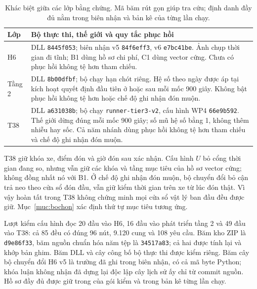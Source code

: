 \begin{table}[htbp]
\centering
\caption{Khác biệt giữa các lớp bằng chứng. Mã băm rút gọn giúp tra cứu;
định danh đầy đủ nằm trong biên nhận và bản kê của từng lần chạy.}
\label{bang:phienban}
\small
\begin{tabularx}{\linewidth}{@{}>{\raggedright\arraybackslash}p{2.1cm}>{\raggedright\arraybackslash}X@{}}
\toprule
\textbf{Lớp} & \textbf{Bộ thực thi, thế giới và quy tắc phục hồi}\\
\midrule
H6 & DLL \texttt{8445f053}; biên nhận v5 \texttt{84f6eff3}, v6 \texttt{e7bc41be}.
Ảnh chụp thời gian đi tĩnh; B1 dùng hồ sơ chi phí, C1 dùng vector cứng.
Chưa có phục hồi không tệ hơn tham chiếu.\\[4pt]
Tầng 2 & DLL \texttt{8b00dfbf}; bộ chạy hạn chót riêng.
Hệ số theo ngày được áp tại kích hoạt quyết định đầu tiên ở hoặc sau mỗi mốc 900 giây.
Không bật phục hồi không tệ hơn hoặc chế độ ghi nhận đón muộn.\\[4pt]
T38 & DLL \texttt{a631038b}; bộ chạy \texttt{runner-tier3-v2}, cấu hình WP4
\texttt{66e9b592}. Thế giới dừng đúng mỗi mốc 900 giây; số mũ hệ số bằng 1,
không thêm nhiễu hay sốc. Cả năm nhánh dùng phục hồi không tệ hơn tham chiếu
và chế độ ghi nhận đón muộn.\\
\bottomrule
\end{tabularx}
\end{table}

T38 giữ khóa xe, điểm đón và giờ đón sau xác nhận. Cấu hình $U$ bỏ cổng thời
gian đang so, nhưng vẫn giữ các khóa và tầng mục tiêu của hồ sơ vector cứng;
không đồng nhất nó với B1. Ở chế độ ghi nhận đón muộn, bộ chuyển đổi bỏ cận
trả neo theo cửa sổ đón đầu, vẫn giữ kiểm thời gian trên xe từ lúc đón thật.
Vì vậy hoàn tất trong T38 không chứng minh mọi cửa sổ vật lý ban đầu đều
được giữ. Mục~\ref{muc:bochon} xác định thứ tự mục tiêu tương ứng.

Lượt kiểm cấu hình đọc 20 đầu vào H6, 16 đầu vào phát triển tầng 2 và 49
đầu vào T38: cả 85 đều có đúng 96 nút, 9.120 cung và 108 yêu cầu. Băm kho
ZIP là \texttt{d9e86f33}, băm nguồn chuẩn hóa năm tệp là \texttt{34517a83};
cả hai được tính lại và khớp bản ghim. Băm DLL và cây công bố bộ thực thi
được kiểm riêng. Băm cây bộ chuyển đổi H6 v5 là trường đã ghi trong biên
nhận, có cả mã byte Python; khóa luận không nhận đã dựng lại độc lập cây
lịch sử ấy chỉ từ commit nguồn. Hồ sơ đầy đủ được giữ trong
 của gói kiểm và trong bản kê từng lần chạy.
